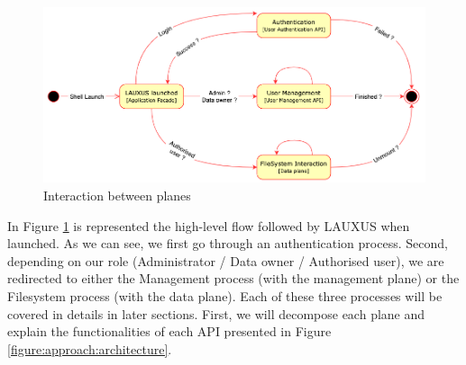 \documentclass[../main.tex]{subfiles}
\begin{document}
\begin{figure}[h]
    \centering
    \includegraphics[width=\textwidth]{images/lauxus/architecture_process}
    
    \caption{Interaction between planes}
    \label{figure:lauxus:architecture_process}
\end{figure}
\par In Figure \ref{figure:lauxus:architecture_process} is represented the high-level flow followed by LAUXUS when launched. As we can see, we first go through an authentication process. Second, depending on our role (Administrator / Data owner / Authorised user), we are redirected to either the Management process (with the management plane) or the Filesystem process (with the data plane). Each of these three processes will be covered in details in later sections. First, we will decompose each plane and explain the functionalities of each API presented in Figure \ref{figure:approach:architecture}.
\end{document}
